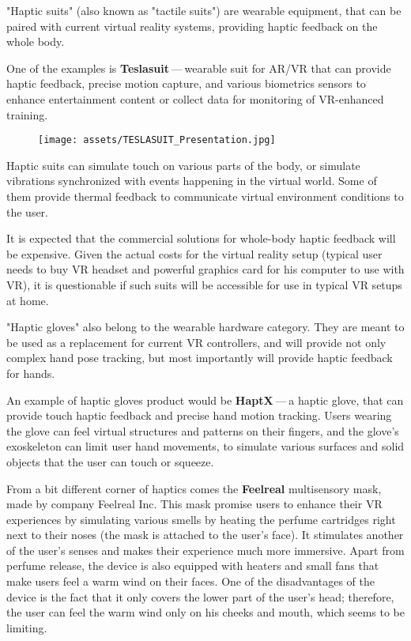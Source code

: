 "Haptic suits" (also known as "tactile suits") are wearable
equipment, that can be paired with current virtual reality systems, providing
haptic feedback on the whole body.


One of the examples is \textbf{Teslasuit} — wearable suit for AR/VR that can provide
haptic feedback, precise motion capture, and various biometrics sensors to
enhance entertainment content or collect data for monitoring of
VR-enhanced training. \hyperlink{teslasuitab}{}


\begin{figure}[h]{}
\centering\texttt{[image: assets/TESLASUIT\_Presentation.jpg]}
\caption{}

\end{figure}

Haptic suits can simulate touch on various parts of the body, or simulate
vibrations synchronized with events happening in the virtual world. Some
of them provide thermal feedback to communicate virtual environment
conditions to the user.


It is expected that the commercial solutions for whole-body haptic feedback
will be expensive. Given the actual costs for the virtual reality setup
(typical user needs to buy VR headset and powerful graphics card for his computer
to use with VR), it is questionable if such suits will be
accessible for use in typical VR setups at home.



"Haptic gloves" also belong to the wearable hardware category. They are meant to be
used as a replacement for current VR controllers, and will provide not only
complex hand pose tracking, but most importantly will provide
haptic feedback for hands.


An example of haptic gloves product would be \textbf{HaptX} — a haptic
glove, that can provide touch haptic feedback and precise
hand motion tracking. Users wearing the glove can feel virtual structures
and patterns on their fingers, and the glove’s exoskeleton can limit user
hand movements, to simulate various surfaces and solid objects that the user can
touch or squeeze. \hyperlink{haptxtech}{}

From a bit different corner of haptics comes the \textbf{Feelreal} multisensory
mask, made by company Feelreal Inc. This mask promise users to enhance
their VR experiences by simulating various smells by heating the perfume
cartridges right next to their noses (the mask is attached to the user’s face).
It stimulates another of the user’s senses and makes their
experience much more immersive. Apart from perfume release, the device is
also equipped with heaters and small fans that make users feel a warm
wind on their faces. One of the disadvantages of the device is the fact that
it only covers the lower part of the user’s head; therefore, the user can feel
the warm wind only on his cheeks and mouth, which seems to be limiting.
